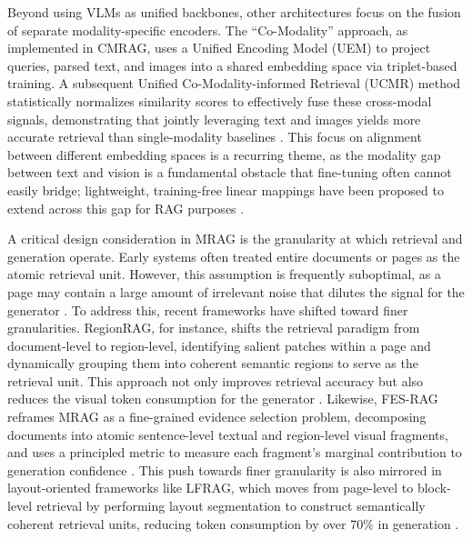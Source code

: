 \documentclass[11pt]{article}
\begin{document}
Beyond using VLMs as unified backbones, other architectures focus on the fusion of separate modality-specific encoders. The ``Co-Modality'' approach, as implemented in CMRAG, uses a Unified Encoding Model (UEM) to project queries, parsed text, and images into a shared embedding space via triplet-based training. A subsequent Unified Co-Modality-informed Retrieval (UCMR) method statistically normalizes similarity scores to effectively fuse these cross-modal signals, demonstrating that jointly leveraging text and images yields more accurate retrieval than single-modality baselines \cite{ref347}. This focus on alignment between different embedding spaces is a recurring theme, as the modality gap between text and vision is a fundamental obstacle that fine-tuning often cannot easily bridge; lightweight, training-free linear mappings have been proposed to extend across this gap for RAG purposes \cite{ref348}.

A critical design consideration in MRAG is the granularity at which retrieval and generation operate. Early systems often treated entire documents or pages as the atomic retrieval unit. However, this assumption is frequently suboptimal, as a page may contain a large amount of irrelevant noise that dilutes the signal for the generator \cite{ref349}. To address this, recent frameworks have shifted toward finer granularities. RegionRAG, for instance, shifts the retrieval paradigm from document-level to region-level, identifying salient patches within a page and dynamically grouping them into coherent semantic regions to serve as the retrieval unit. This approach not only improves retrieval accuracy but also reduces the visual token consumption for the generator \cite{ref350}. Likewise, FES-RAG reframes MRAG as a fine-grained evidence selection problem, decomposing documents into atomic sentence-level textual and region-level visual fragments, and uses a principled metric to measure each fragment's marginal contribution to generation confidence \cite{ref349}. This push towards finer granularity is also mirrored in layout-oriented frameworks like LFRAG, which moves from page-level to block-level retrieval by performing layout segmentation to construct semantically coherent retrieval units, reducing token consumption by over 70\% in generation \cite{ref351}.
\end{document}
